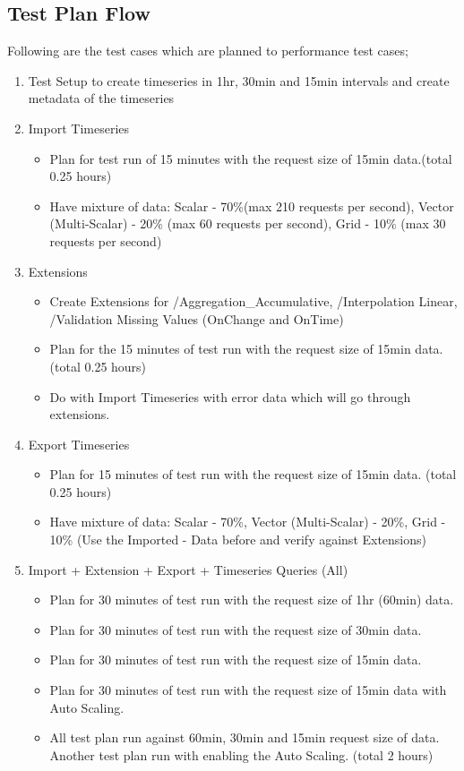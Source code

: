 \subsection{Test Plan Flow}
\label{subse:test_plan_flow}
Following are the test cases which are planned to performance test cases;
\begin{enumerate}
    \item Test Setup to create timeseries in 1hr, 30min and 15min intervals and create metadata of the timeseries
    \item Import Timeseries
    \begin{itemize}
        \item Plan for test run of 15 minutes with the request size of 15min data.(total 0.25 hours)
        \item Have mixture of data: Scalar - 70\%(max 210 requests per second), Vector (Multi-Scalar) - 20\% (max 60 requests per second), Grid - 10\% (max 30 requests per second)
    \end{itemize}
    \item Extensions
    \begin{itemize}
        \item Create Extensions for /Aggregation\_Accumulative, /Interpolation Linear, /Validation Missing Values (OnChange and OnTime)
        \item Plan for the 15 minutes of test run with the request size of 15min data. (total 0.25 hours)
        \item Do with Import Timeseries with error data which will go through extensions.
    \end{itemize}
    \item Export Timeseries
    \begin{itemize}
        \item Plan for 15 minutes of test run with the request size of 15min data. (total 0.25 hours)
        \item Have mixture of data: Scalar - 70\%, Vector (Multi-Scalar) - 20\%, Grid - 10\% (Use the Imported - Data before and verify against Extensions)
    \end{itemize}
    \item Import + Extension + Export + Timeseries Queries (All)
    \begin{itemize}
        \item Plan for 30 minutes of test run with the request size of 1hr (60min) data.
        \item Plan for 30 minutes of test run with the request size of 30min data.
        \item Plan for 30 minutes of test run with the request size of 15min data.
        \item Plan for 30 minutes of test run with the request size of 15min data with Auto Scaling.
        \item All test plan run against 60min, 30min and 15min request size of data. Another test plan run with enabling the Auto Scaling. (total 2 hours)
    \end{itemize}
\end{enumerate}

